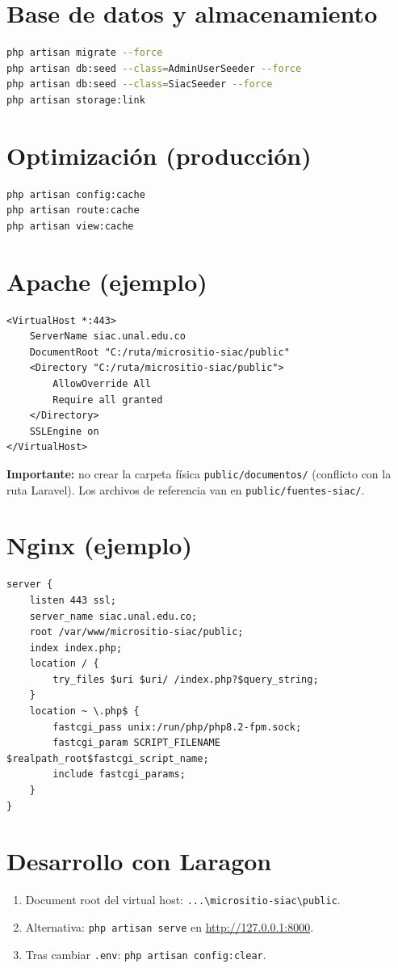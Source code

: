 \section{Base de datos y almacenamiento}
\begin{lstlisting}[language=bash]
php artisan migrate --force
php artisan db:seed --class=AdminUserSeeder --force
php artisan db:seed --class=SiacSeeder --force
php artisan storage:link
\end{lstlisting}

\section{Optimización (producción)}
\begin{lstlisting}[language=bash]
php artisan config:cache
php artisan route:cache
php artisan view:cache
\end{lstlisting}

\section{Apache (ejemplo)}
\begin{lstlisting}
<VirtualHost *:443>
    ServerName siac.unal.edu.co
    DocumentRoot "C:/ruta/micrositio-siac/public"
    <Directory "C:/ruta/micrositio-siac/public">
        AllowOverride All
        Require all granted
    </Directory>
    SSLEngine on
</VirtualHost>
\end{lstlisting}

\textbf{Importante:} no crear la carpeta física \texttt{public/documentos/} (conflicto con la ruta Laravel). Los archivos de referencia van en \texttt{public/fuentes-siac/}.

\section{Nginx (ejemplo)}
\begin{lstlisting}
server {
    listen 443 ssl;
    server_name siac.unal.edu.co;
    root /var/www/micrositio-siac/public;
    index index.php;
    location / {
        try_files $uri $uri/ /index.php?$query_string;
    }
    location ~ \.php$ {
        fastcgi_pass unix:/run/php/php8.2-fpm.sock;
        fastcgi_param SCRIPT_FILENAME $realpath_root$fastcgi_script_name;
        include fastcgi_params;
    }
}
\end{lstlisting}

\section{Desarrollo con Laragon}
\begin{enumerate}
  \item Document root del virtual host: \texttt{...\textbackslash micrositio-siac\textbackslash public}.
  \item Alternativa: \texttt{php artisan serve} en \url{http://127.0.0.1:8000}.
  \item Tras cambiar \texttt{.env}: \texttt{php artisan config:clear}.
\end{enumerate}

